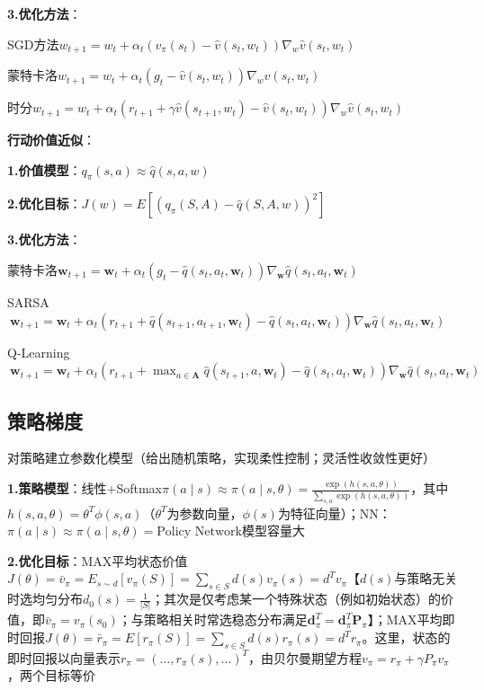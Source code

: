 	\textbf{3.优化方法}：
	
	SGD方法$w_{t+1}=w_t+\alpha_t\left(v_{\pi}\left(s_t\right)-\hat{v}\left(s_t, w_t\right)\right)\nabla_{w} \hat{v}\left(s_t, w_t\right)$
	
	蒙特卡洛$w_{t+1}=w_t+\alpha_t\left(g_t-\hat{v}\left(s_t, w_t\right)\right)\nabla_{w} \hat{v}\left(s_t, w_t\right)$
	
	时分$w_{t+1}=w_t+\alpha_t\left(r_{t+1}+\gamma\hat{v}\left(s_{t+1}, w_t\right)-\hat{v}\left(s_t, w_t\right)\right)\nabla_{w} \hat{v}\left(s_t, w_t\right)$
	
	\textbf{行动价值近似}：
	
	\textbf{1.价值模型}：$q_\pi(s, a)\approx\hat{q}(s, a, w)$
	
	\textbf{2.优化目标}：$J(w)=E\left[\left(q_\pi(S, A)-\hat{q}(S, A, w)\right)^2\right]$
	
	\textbf{3.优化方法}：
	
	蒙特卡洛$\mathbf{w}_{t+1} = \mathbf{w}_t + \alpha_t(g_t - \hat{q}(s_t,a_t,\mathbf{w}_t))\nabla_{\mathbf{w}}\hat{q}(s_t,a_t,\mathbf{w}_t)$
	
	SARSA$~\mathbf{w}_{t+1} = \mathbf{w}_t + \alpha_t(r_{t+1} + \hat{q}(s_{t+1},a_{t+1},\mathbf{w}_t) - \hat{q}(s_t,a_t,\mathbf{w}_t))\nabla_{\mathbf{w}}\hat{q}(s_t,a_t,\mathbf{w}_t)$
	
	Q-Learning$~\mathbf{w}_{t+1} = \mathbf{w}_t + \alpha_t(r_{t+1} + \max_{a\in\mathbf{A}}\hat{q}(s_{t+1},a,\mathbf{w}_t) - \hat{q}(s_t,a_t,\mathbf{w}_t))\nabla_{\mathbf{w}}\hat{q}(s_t,a_t,\mathbf{w}_t)$
	
	\subsection*{策略梯度}
	对策略建立参数化模型（给出随机策略，实现柔性控制；灵活性收敛性更好）
	
	\textbf{1.策略模型}：线性+Softmax$\pi(a\mid s)\approx\pi(a\mid s,\theta)=\frac{\exp(h(s, a,\theta))}{\sum_{s, a}\exp(h(s, a,\theta))}$，其中$h(s, a,\theta)=\theta^T\phi(s, a)$（$\theta^T$为参数向量，$\phi(s)$为特征向量）；NN：$\pi(a\mid s)\approx\pi(a\mid s,\theta)=\text{Policy Network}$模型容量大
	
	\textbf{2.优化目标}：MAX平均状态价值$J(\theta)=\bar{v}_{\pi}=E_{s\sim d}\left[v_{\pi}(S)\right]=\sum_{s\in S} d(s) v_{\pi}(s)=d^T v_{\pi}$【$d(s)$与策略无关时选均匀分布$d_0(s)=\frac{1}{|S|}$；其次是仅考虑某一个特殊状态（例如初始状态）的价值，即$\bar{v}_\pi=v_\pi\left(s_0\right)$；与策略相关时常选稳态分布满足$\mathbf{d}_\pi^T=\mathbf{d}_\pi^T \mathbf{P}_\pi$】；MAX平均即时回报$J(\theta)=\bar{r}_\pi=E\left[r_\pi(S)\right]=\sum_{s\in S} d(s) r_\pi(s)=d^T r_\pi$。这里，状态的即时回报以向量表示$r_\pi=\left(\ldots, r_\pi(s),\ldots\right)^T$，由贝尔曼期望方程$v_{\pi}=r_{\pi}+\gamma P_{\pi} v_{\pi}$，两个目标等价
	
